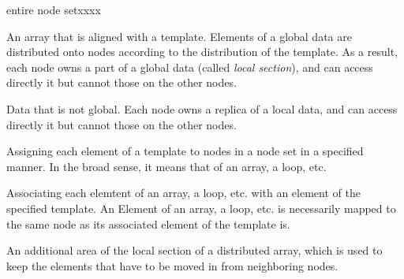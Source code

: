 \begin{namelist}{entire node setxxxx}


 An array that is aligned with a template. Elements of a global data are
 distributed onto nodes according to the distribution of the
 template. As a result, each node owns a part of a global data (called
 {\it local section}), and can access directly it but cannot those on
 the other nodes.



 Data that is not global. Each node owns a replica of a local data,
 and can access directly it but cannot those on the other nodes.



 Assigning each element of a template to nodes in a node set in a
 specified manner. In the broad sense, it means that of an array, a
 loop, etc.



 Associating each elemtent of an array, a loop, etc. with an element of
 the specified template. An Element of an array, a loop, etc. is
 necessarily mapped to the same node as its associated element of the
 template is.



 An additional area of the local section of a distributed array, which
 is used to keep the elements that have to be moved in from neighboring
 nodes.


\end{namelist}


